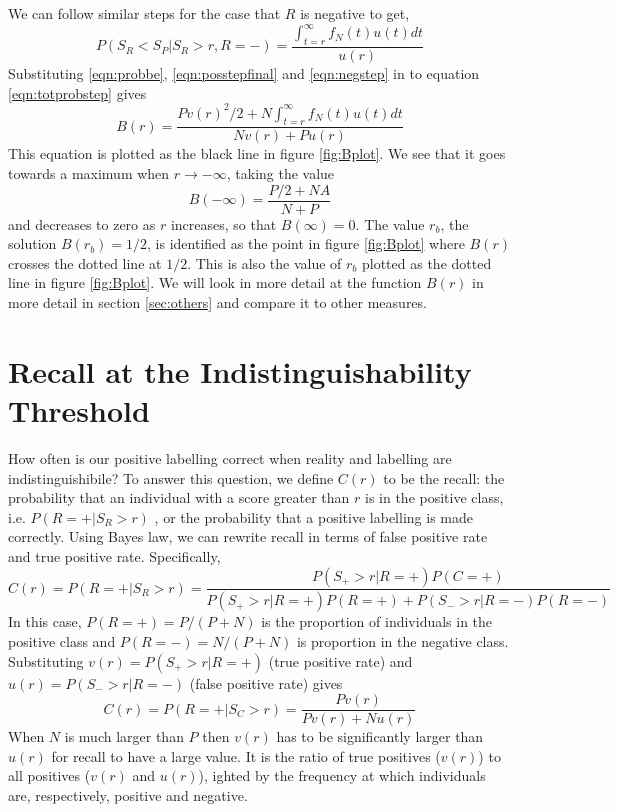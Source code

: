 \documentclass{article}
\begin{document}
We can follow similar steps for the case that $R$ is negative to get,
\begin{equation}
P(S_R < S_P | S_{R} > r ,  R = -   ) = \frac{\int_{t=r}^\infty f_N(t) u(t) dt}{u(r)}  \label{eqn:negstep}
\end{equation}
Substituting \ref{eqn:probbe}, \ref{eqn:posstepfinal} and \ref{eqn:negstep} in to equation \ref{eqn:totprobstep} gives
\begin{equation}
B(r) = \frac{P v(r)^2/2 + N \int_{t=r}^\infty f_N(t) u(t) dt }{N v(r) + P u(r)} 
 \label{eqn:Bdef} 
\end{equation}
This equation is plotted as the black line in figure \ref{fig:Bplot}. We see that it goes towards a maximum when $r \rightarrow -\infty$, taking the value
\[
B(-\infty) = \frac{P/2 + N A}{N + P} 
\]
and decreases to zero as $r$ increases, so that $B(\infty) = 0$. The value $r_b$, the solution $B(r_b)=1/2$, is identified as the point in figure \ref{fig:Bplot} where $B(r)$ crosses the dotted line at $1/2$. This is also the value of $r_b$ plotted as the dotted line in figure \ref{fig:Bplot}. We will look in more detail at the function $B(r)$ in more detail in section \ref{sec:others} and compare it to other measures. 

\section{Recall at the Indistinguishability Threshold}

How often is our positive labelling correct when reality and labelling are indistinguishibile? To answer this question, we define $C(r)$ to be the recall: the probability that an individual with a score greater than $r$ is in the positive class, i.e. $P(R = + | S_R > r)$ , or the probability that a positive labelling is made correctly.  Using Bayes law, we can rewrite recall in terms of false positive rate and true positive rate. Specifically,
\[
C(r) = P(R = + | S_R > r) = \frac{P(S_+ > r | R = + ) P(C = + )}{P(S_+ > r | R = + ) P(R = + ) + P(S_- > r | R = - ) P(R = - )}
\]
In this case, $P(R = + ) = P/(P+N)$ is the proportion of individuals in the positive class and $P(R = - ) = N/(P+N)$ is proportion in the negative class. Substituting $v(r)=P(S_+ > r | R = + )$ (true positive rate) and $u(r) = P(S_- > r | R = - )$  (false positive rate) gives
\begin{equation}
C(r) = P(R = + | S_C > r) = \frac{P v(r)}{P v(r) + N u(r)} \label{RecallP}
\end{equation}
When $N$ is much larger than $P$ then $v(r)$ has to be significantly larger than $u(r)$ for recall to have a large value. It is the ratio of true positives ($v(r)$) to all positives ($v(r)$ and $u(r)$), ighted by the frequency at which individuals are, respectively, positive and negative. 
\end{document}
